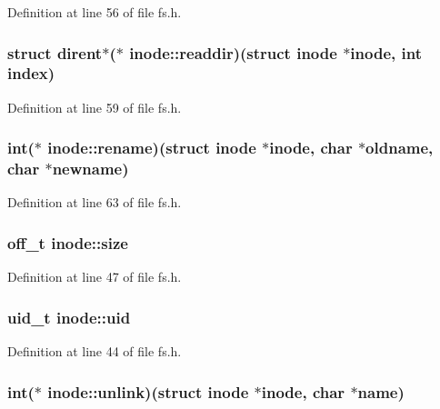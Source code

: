 Definition at line 56 of file fs.\+h.

\hypertarget{structinode_a0a54c11571f19f23322f3e6ad3ecb113}{
\subsubsection[{readdir}]{\setlength{\rightskip}{0pt plus 5cm}struct {\bf dirent}$\ast$($\ast$ inode\+::readdir)(struct {\bf inode} $\ast${\bf inode}, int index)}}\label{structinode_a0a54c11571f19f23322f3e6ad3ecb113}


Definition at line 59 of file fs.\+h.

\hypertarget{structinode_a5a309a9c4ada7e4d062162b06125a929}{
\subsubsection[{rename}]{\setlength{\rightskip}{0pt plus 5cm}int($\ast$ inode\+::rename)(struct {\bf inode} $\ast${\bf inode}, char $\ast$oldname, char $\ast$newname)}}\label{structinode_a5a309a9c4ada7e4d062162b06125a929}


Definition at line 63 of file fs.\+h.

\hypertarget{structinode_a53722b1b60b7136ce0204b66527bb400}{
\subsubsection[{size}]{\setlength{\rightskip}{0pt plus 5cm}off\+\_\+t inode\+::size}}\label{structinode_a53722b1b60b7136ce0204b66527bb400}


Definition at line 47 of file fs.\+h.

\hypertarget{structinode_a0eac94e96ded19029e871d5cce815bcb}{
\subsubsection[{uid}]{\setlength{\rightskip}{0pt plus 5cm}uid\+\_\+t inode\+::uid}}\label{structinode_a0eac94e96ded19029e871d5cce815bcb}


Definition at line 44 of file fs.\+h.

\hypertarget{structinode_adf65bac80736631b8000d3d34e953aaa}{
\subsubsection[{unlink}]{\setlength{\rightskip}{0pt plus 5cm}int($\ast$ inode\+::unlink)(struct {\bf inode} $\ast${\bf inode}, char $\ast${\bf name})}}\label{structinode_adf65bac80736631b8000d3d34e953aaa}


